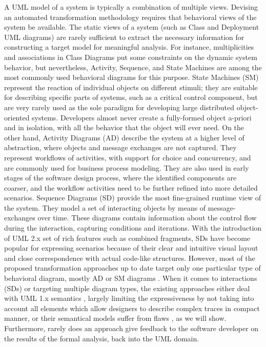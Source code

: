 \documentclass[letter]{llncs}
\begin{document}
A UML model of a system is typically a combination of multiple views. 
Devising an automated transformation
methodology 
requires that behavioral views of the system be available. The static views of
a system (such as Class and Deployment UML diagrams) are rarely sufficient to
extract the necessary information for constructing a target model for meaningful analysis. 
For instance, multiplicities and associations in Class Diagrams put some constraints on the dynamic system behavior,
but nevertheless,
Activity, Sequence, and State Machines are among the most commonly used behavioral diagrams
for this purpose.
State Machines (SM) represent the reaction of individual objects on different stimuli;
they are suitable for describing 
specific parts of systems, such as a critical control component, but are very
rarely used \cite{inpJuDuJuLaPo06a} as the sole paradigm for developing large
distributed object-oriented systems. Developers almost never
create a fully-formed object a-priori and in isolation, with all the behavior that the object will ever
need.
On the other hand, Activity Diagrams (AD) describe the system at a higher level of
abstraction, where objects and message exchanges are not captured. They represent 
workflows of activities, with support for choice and concurrency, and 
are commonly used for business process modeling. They are also used in early
stages of the software design process,
where the identified components are coarser, and the workflow activities 
need to be further refined into more detailed scenarios. 
Sequence Diagrams (SD) provide the most fine-grained runtime view of
the system. 
They model a set of interacting objects by means of message-exchanges over time.
These diagrams contain information about the control flow during the
interaction, capturing 
conditions and iterations. With the introduction of UML 2.x set of rich features
such as combined fragments, SDs have become popular for expressing scenarios because of their clear
and intuitive visual layout and close correspondence with actual code-like
structures. 
However,
most of the proposed transformation approaches up to date target only one
particular type of
behavioral diagram, mostly AD or SM diagrams
\cite{Tribastone:2008:AEP:1383559.1383569,inpJuDuJuLaPo06a,Cao:2006:TMV:1169227.1169783,E_business,Siveroni:2008:PSS:1371602.1371879}. When it comes
to
interactions (SDs) or targeting multiple diagram types, the existing approaches either deal with UML 1.x
semantics \cite{Tribastone:2008:ATU:1446304.1447447,sarma1,Rasch:2005:CVS:2144745.2144752,GallardoMP02,pokozy-korenblat_04_toward}, 
largely limiting the expressiveness by not taking into account
all
elements which allow designers to describe complex traces in compact manner, 
or their semantical models suffer from flaws
\cite{Tribastone:2008:ATU:1446304.1447447,pokozy-korenblat_04_toward}, as we will show.
Furthermore, rarely \cite{Hansen:2010:AVE:2188418.2188435} does an approach give feedback to the software developer 
on the results of the formal analysis, back into the UML domain. 
\end{document}
